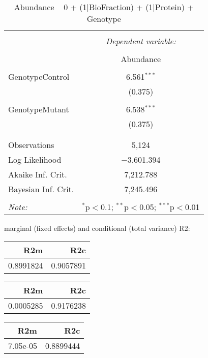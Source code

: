 \documentclass[11pt]{report}
\begin{document}
\begin{table}[!htbp] \centering 
  \caption{Abundance ~ 0 + (1|BioFraction) + (1|Protein) + Genotype} 
  \label{} 
\begin{tabular}{@{\extracolsep{5pt}}lc} 
\\[-1.8ex]\hline 
\hline \\[-1.8ex] 
 & \multicolumn{1}{c}{\textit{Dependent variable:}} \\ 
\cline{2-2} 
\\[-1.8ex] & Abundance \\ 
\hline \\[-1.8ex] 
 GenotypeControl & 6.561$^{***}$ \\ 
  & (0.375) \\ 
  & \\ 
 GenotypeMutant & 6.538$^{***}$ \\ 
  & (0.375) \\ 
  & \\ 
\hline \\[-1.8ex] 
Observations & 5,124 \\ 
Log Likelihood & $-$3,601.394 \\ 
Akaike Inf. Crit. & 7,212.788 \\ 
Bayesian Inf. Crit. & 7,245.496 \\ 
\hline 
\hline \\[-1.8ex] 
\textit{Note:}  & \multicolumn{1}{r}{$^{*}$p$<$0.1; $^{**}$p$<$0.05; $^{***}$p$<$0.01} \\ 
\end{tabular} 
\end{table} 
marginal (fixed effects) and conditional (total variance) R2:

\begin{tabular}{r|r}
\hline
R2m & R2c\\
\hline
0.8991824 & 0.9057891\\
\hline
\end{tabular}

\begin{tabular}{r|r}
\hline
R2m & R2c\\
\hline
0.0005285 & 0.9176238\\
\hline
\end{tabular}

\begin{tabular}{r|r}
\hline
R2m & R2c\\
\hline
7.05e-05 & 0.8899444\\
\hline
\end{tabular}
\end{document}
